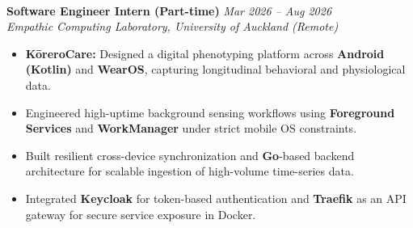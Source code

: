 \noindent\\
\textbf{Software Engineer Intern (Part-time)} \hfill \textit{Mar 2026 -- Aug 2026}\\
\textit{Empathic Computing Laboratory, University of Auckland (Remote)}\\[0.05em]

\begin{itemize}[leftmargin=*, itemsep=0.2em, topsep=0.1em]
    \item \textbf{KōreroCare:} Designed a digital phenotyping platform across \textbf{Android (Kotlin)} and \textbf{WearOS}, capturing longitudinal behavioral and physiological data.
    \item Engineered high-uptime background sensing workflows using \textbf{Foreground Services} and \textbf{WorkManager} under strict mobile OS constraints.
    \item Built resilient cross-device synchronization and \textbf{Go}-based backend architecture for scalable ingestion of high-volume time-series data.
    \item Integrated \textbf{Keycloak} for token-based authentication and \textbf{Traefik} as an API gateway for secure service exposure in Docker.
\end{itemize}




